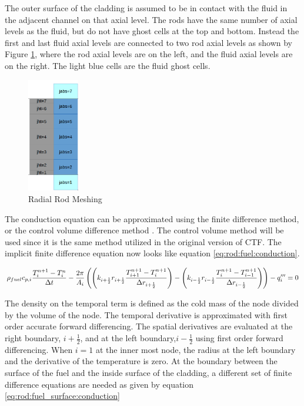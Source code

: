 The outer surface of the cladding is assumed to be in contact with the fluid in
the  adjacent channel on that axial level. The rods have the same number of
axial  levels as the fluid, but do not have ghost cells at the top and bottom.
Instead  the first and last fluid axial levels are connected to two rod axial
levels as  shown by Figure \ref{fig:fluid-solid-meshing}, where the rod axial
levels are on the left, and the fluid  axial levels are on the right. The light
blue cells are the fluid ghost cells.

	\begin{figure}[!h]
		\centering
		\includegraphics[width=0.20\textwidth]{images/fluid-solid-meshing.png}
		\caption{Radial Rod Meshing}
		\label{fig:fluid-solid-meshing}
	\end{figure}

The conduction equation can be approximated using the finite difference method,
or the control volume difference method \cite{Botte2000}. The control volume
method will be used  since it is the same method utilized in the original
version of CTF. The implicit  finite difference equation now looks like equation
\ref{eq:rod:fuel:conduction}.

\begin{equation}
	\small
	\label{eq:rod:fuel:conduction}
	  \rho_{fuel}c_{p,i}\frac{T^{n+1}_{i}-T^{n}_{i}}{\Delta t}
	- \frac{2\pi}{A_{i}}\left( 
		\left(k_{i+\frac{1}{2}}r_{i+\frac{1}{2}}
		\frac{T^{n+1}_{i+1}-T^{n+1}_{i}}{\Delta r_{i+\frac{1}{2}}}\right)
 	  - \left(k_{i-\frac{1}{2}}r_{i-\frac{1}{2}}
		\frac{T^{n+1}_{i}-T^{n+1}_{i-1}}{\Delta r_{i-\frac{1}{2}}}\right)
	  \right)
	- q_{i}'''
	= 0
\end{equation}

The density on the temporal term is defined as the cold mass of the node divided
by the volume of the node. The temporal derivative is approximated with first
order accurate forward differencing. The spatial derivatives are evaluated at the right
boundary, $i+\frac{1}{2}$, and at the left boundary,$i-\frac{1}{2}$ using first
order forward differencing. When $i=1$ at the inner most node, the radius at the
left boundary and the derivative of the temperature is zero. At the boundary
between the surface of the fuel and the inside surface of the cladding, a
different set of finite difference equations are needed as given by equation
\ref{eq:rod:fuel_surface:conduction}

